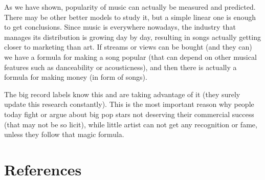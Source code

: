 \documentclass[11pt]{article}\usepackage[]{graphicx}\usepackage[]{xcolor}
\begin{document}
As we have shown, popularity of music can actually be measured and predicted. There may be other better models to study it, but a simple linear one is enough to get conclusions. Since music is everywhere nowadays, the industry that manages its distribution is growing day by day, resulting in songs actually getting closer to marketing than art. If streams or views can be bought (and they can) we have a formula for making a song popular (that can depend on other musical features such as danceability or acousticness), and then there is actually a formula for making money (in form of songs). 

The big record labels know this and are taking advantage of it (they surely update this research constantly). This is the most important reason why people today fight or argue about big pop stars not deserving their commercial success (that may not be so licit), while little artist can not get any recognition or fame, unless they follow that magic formula.


\section{References}

\begin{small}

\end{small}
\end{document}
